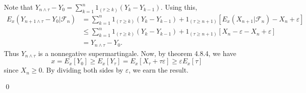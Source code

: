 \begin{problem}[5.5.9] \hfill
	
	Note that $Y_{n\wedge \tau} - Y_0 = \sum_{k=1}^n 1_{\left( \tau \ge k \right)}\left( Y_k - Y_{k-1} \right).$
	Using this,
	\[
		\begin{split}
			E_x\left( Y_{n+1 \wedge \tau} - Y_0 \lvert \mathcal{F}_n \right)
			&= \sum_{k=1}^n 1_{\left( \tau \ge k \right)}\left( Y_k - Y_{k-1} \right)
		+ 1_{\left( \tau \ge n+1 \right)}\left [E_x\left( X_{n+1} \lvert \mathcal{F}_n \right) - X_n +\varepsilon \right ]\\
		&\le \sum_{k=1}^n 1_{\left( \tau \ge k \right)}\left( Y_k - Y_{k-1} \right) + 1_{\left( \tau \ge n+1 \right)}\left[ X_n - \varepsilon - X_n + \varepsilon \right] \\
		&= Y_{n\wedge \tau}-Y_0.
		\end{split}
	\]
	Thus $Y_{n\wedge \tau}$ is a nonnegative supermartingale.
	Now, by theorem 4.8.4, we have
	\[
		x = E_x[Y_0] \ge E_x[Y_\tau] = E_x[X_\tau + \tau \varepsilon] \ge \varepsilon E_x[\tau]
	\]
	since $X_n \ge 0$.
	By dividing both sides by $\varepsilon$, we earn the result.

	\qed
\end{problem}
